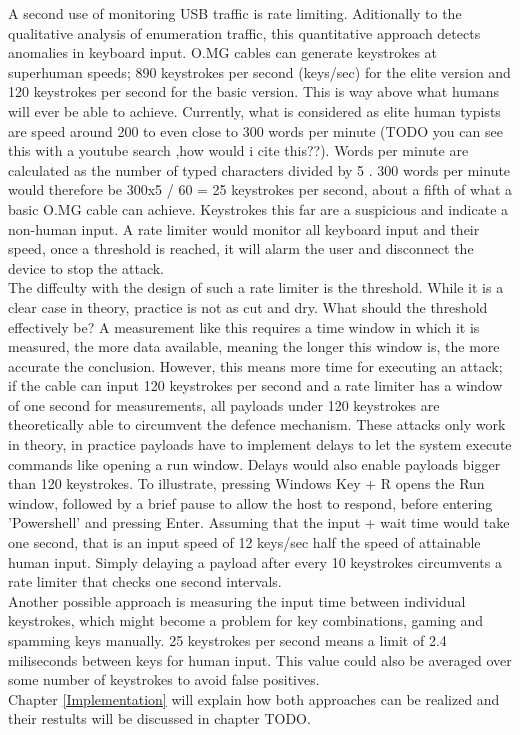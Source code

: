 A second use of monitoring USB traffic is rate limiting. Aditionally to the qualitative analysis of enumeration traffic, this quantitative approach detects anomalies in keyboard input. O.MG cables can generate keystrokes at superhuman speeds; 890 keystrokes per second (keys/sec) for the elite version and 120 keystrokes per second for the basic version. This is way above what humans will ever be able to achieve. Currently, what is considered as elite human typists are speed around 200 to even close to 300 words per minute (TODO you can see this with a youtube search ,how would i cite this??). Words per minute are calculated as the number of typed characters divided by 5 \cite{travisWhatWordsMinute2015}. 300 words per minute would therefore be 300x5 / 60 = 25 keystrokes per second, about a fifth of what a basic O.MG cable can achieve.
Keystrokes this far are a suspicious and indicate a non-human input. A rate limiter would monitor all keyboard input and their speed, once a threshold is reached, it will alarm the user and disconnect the device to stop the attack. \\
The diffculty with the design of such a rate limiter is the threshold. While it is a clear case in theory, practice is not as cut and dry. What should the threshold effectively be? A measurement like this requires a time window in which it is measured, the more data available, meaning the longer this window is, the more accurate the conclusion. However, this means more time for executing an attack; if the cable can input 120 keystrokes per second and a rate limiter has a window of one second for measurements, all payloads under 120 keystrokes are theoretically able to circumvent the defence mechanism. These attacks only work in theory, in practice payloads have to implement delays to let the system execute commands like opening a run window. 
Delays would also enable payloads bigger than 120 keystrokes. To illustrate, pressing Windows Key + R opens the Run window, followed by a brief pause to allow the host to respond, before entering 'Powershell' and pressing Enter. Assuming that the input + wait time would take one second, that is an input speed of 12 keys/sec half the speed of attainable human input. Simply delaying a payload after every 10 keystrokes circumvents a rate limiter that checks one second intervals.  \\
Another possible approach is measuring the input time between individual keystrokes, which might become a problem for key combinations, gaming and spamming keys manually. 25 keystrokes per second means a limit of 2.4 miliseconds between keys for human input. This value could also be averaged over some number of keystrokes to avoid false positives. \\
Chapter \ref{Implementation} will explain how both approaches can be realized and their restults will be discussed in chapter TODO.


